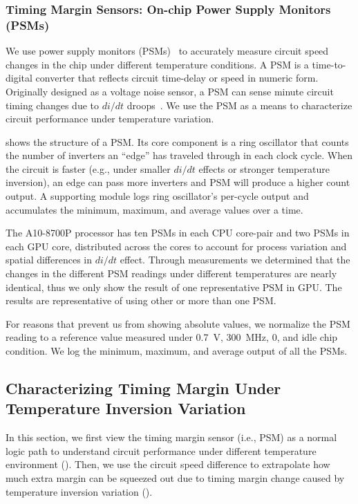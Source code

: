 \subsubsection{Timing Margin Sensors: On-chip Power Supply Monitors (PSMs)}
\label{sec:tistate:setup:psm}

We use power supply monitors (PSMs)~\cite{grenat20145,gillespie2014streamroller} to accurately measure circuit speed changes in the chip under different temperature conditions. A PSM is a time-to-digital converter that reflects circuit time-delay or speed in numeric form. Originally designed as a voltage noise sensor, a PSM can sense minute circuit timing changes due to $di/dt$ droops~\cite{grenat20145}. We use the PSM as a means to characterize circuit performance under temperature variation.

 shows the structure of a PSM. Its core component is a ring oscillator that counts the number of inverters an ``edge'' has traveled through in each clock cycle. When the circuit is faster (e.g., under smaller $di/dt$ effects or stronger temperature inversion), an edge can pass more inverters and PSM will produce a higher count output. A supporting module logs ring oscillator's per-cycle output and accumulates the minimum, maximum, and average values over a time.

The A10-8700P processor has ten PSMs in each CPU core-pair and two PSMs in each GPU core, distributed across the cores to account for process variation and spatial differences in $di/dt$ effect. Through measurements we determined that the changes in the different PSM readings under different temperatures are nearly identical, thus we only show the result of one representative PSM in GPU. The results are representative of using other or more than one PSM. 

For reasons that prevent us from showing absolute values, we normalize the PSM reading to a reference value measured under 0.7~V, 300~MHz, 0\C, and idle chip condition. We log the minimum, maximum, and average output of all the PSMs. 

\subsection{Characterizing Timing Margin Under Temperature Inversion Variation}
\label{sec:tistate:characterize}

In this section, we first view the timing margin sensor (i.e., PSM) as a normal logic path to understand circuit performance under different temperature environment (). Then, we use the circuit speed difference to extrapolate how much extra margin can be squeezed out due to timing margin change caused by temperature inversion variation ().

